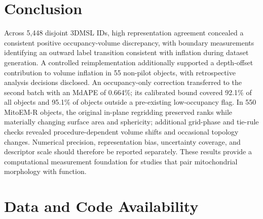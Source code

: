 \documentclass[journal]{IEEEtran}
\begin{document}
\section{Conclusion}

Across 5,448 disjoint 3DMSL IDs, high representation agreement concealed a consistent positive occupancy-volume discrepancy, with boundary measurements identifying an outward label transition consistent with inflation during dataset generation. A controlled reimplementation additionally supported a depth-offset contribution to volume inflation in 55 non-pilot objects, with retrospective analysis decisions disclosed. An occupancy-only correction transferred to the second batch with an MdAPE of 0.664\%; its calibrated bound covered 92.1\% of all objects and 95.1\% of objects outside a pre-existing low-occupancy flag. In 550 MitoEM-R objects, the original in-plane regridding preserved ranks while materially changing surface area and sphericity; additional grid-phase and tie-rule checks revealed procedure-dependent volume shifts and occasional topology changes. Numerical precision, representation bias, uncertainty coverage, and descriptor scale should therefore be reported separately. These results provide a computational measurement foundation for studies that pair mitochondrial morphology with function.

\section*{Data and Code Availability}
\end{document}
